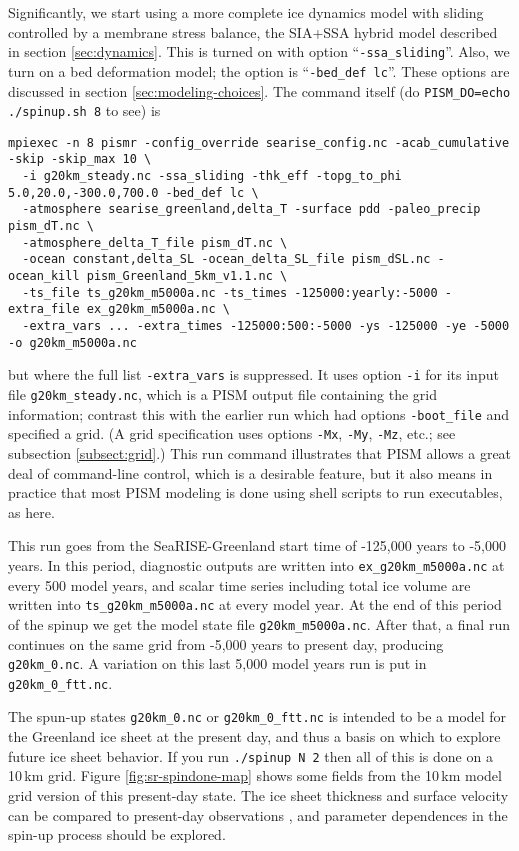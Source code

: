 Significantly, we start using a more complete ice dynamics model with sliding controlled by a membrane stress balance, the SIA+SSA hybrid model described in section \ref{sec:dynamics}.  This is turned on with option ``\texttt{-ssa_sliding}''.  Also, we turn on a bed deformation model; the option is ``\texttt{-bed_def lc}''.  These options are discussed in section \ref{sec:modeling-choices}.  The command itself (do \verb|PISM_DO=echo ./spinup.sh 8| to see) is
\small
\begin{verbatim}
mpiexec -n 8 pismr -config_override searise_config.nc -acab_cumulative -skip -skip_max 10 \
  -i g20km_steady.nc -ssa_sliding -thk_eff -topg_to_phi 5.0,20.0,-300.0,700.0 -bed_def lc \
  -atmosphere searise_greenland,delta_T -surface pdd -paleo_precip pism_dT.nc \
  -atmosphere_delta_T_file pism_dT.nc \
  -ocean constant,delta_SL -ocean_delta_SL_file pism_dSL.nc -ocean_kill pism_Greenland_5km_v1.1.nc \
  -ts_file ts_g20km_m5000a.nc -ts_times -125000:yearly:-5000 -extra_file ex_g20km_m5000a.nc \
  -extra_vars ... -extra_times -125000:500:-5000 -ys -125000 -ye -5000 -o g20km_m5000a.nc
\end{verbatim}
\normalsize
but where the full list \verb|-extra_vars| is suppressed.  It uses option \verb|-i| for its input file \verb|g20km_steady.nc|, which is a PISM output file containing the grid information; contrast this with the earlier run which had options \verb|-boot_file| and specified a grid.   (A grid specification uses options \verb|-Mx|, \verb|-My|, \verb|-Mz|, etc.; see subsection \ref{subsect:grid}.)  This run command illustrates that PISM allows a great deal of command-line control, which is a desirable feature, but it also means in practice that most PISM modeling is done using shell scripts to run executables, as here.

This run goes from the SeaRISE-Greenland start time of -125,000 years to -5,000 years.  In this period, diagnostic outputs are written into \texttt{ex_g20km_m5000a.nc} at every 500 model years, and scalar time series including total ice volume are written into \texttt{ts_g20km_m5000a.nc} at every model year.  At the end of this period of the spinup we get the model state file \texttt{g20km_m5000a.nc}.  After that, a final run continues on the same grid from -5,000 years to present day, producing \texttt{g20km_0.nc}.  A variation on this last 5,000 model years run is put in \texttt{g20km_0_ftt.nc}.



The spun-up states \texttt{g20km_0.nc} or \texttt{g20km_0_ftt.nc} is intended to be a model for the Greenland ice sheet at the present day, and thus a basis on which to explore future ice sheet behavior.  If you run \texttt{./spinup N 2} then all of this is done on a 10\,km grid.  Figure \ref{fig:sr-spindone-map} shows some fields from the 10\,km model grid version of this present-day state.  The ice sheet thickness and surface velocity can be compared to present-day observations \cite{BKAJS}, and parameter dependences in the spin-up process should be explored.

